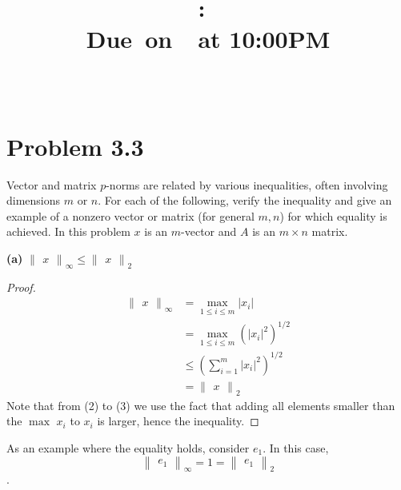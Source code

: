 \documentclass{article}
\title{
    \vspace{2in}
    \textmd{\textbf{\hmwkClass:\ \hmwkTitle}}\\
    \normalsize\vspace{0.1in}\small{Due\ on\ \hmwkDueDate\ at 10:00PM}\\
    \vspace{0.1in}\large{\textit{\hmwkClassInstructor\ \hmwkClassTime}}
    \vspace{3in}
}
\author{\hmwkAuthorName}
\date{}
\begin{document}
\maketitle

\pagebreak
\section*{Problem 3.3}
Vector and matrix $p$-norms are related by various inequalities, often involving dimensions $m$ or $n$. For each of the following, verify the inequality and give an example of a nonzero vector or matrix (for general $m, n$) for which equality is achieved. In this problem $x$ is an $m$-vector and $A$ is an $m\times n$ matrix.

\textbf{(a)}
$\begin{Vmatrix}
        x
    \end{Vmatrix}_\infty  \leq \begin{Vmatrix}
        x
    \end{Vmatrix}_2$
    \begin{proof}
        \begin{align}
            \begin{Vmatrix} x \end{Vmatrix}_\infty &= \max_{1 \leq i \leq m} \lvert x_i \rvert\\
            &= \max_{1 \leq i \leq m} \left( \lvert x_i \rvert^2 \right)^{1/2}\\
            &\leq \left( \sum_{i = 1}^m \lvert x_i \rvert^2 \right)^{1/2}\\
            &= \begin{Vmatrix}
                x
            \end{Vmatrix}_2
        \end{align}
        Note that from (2) to (3) we use the fact that adding all elements smaller than the $\max$ $x_i$ to $x_i$ is larger, hence the inequality.
    \end{proof}
    
    As an example where the equality holds, consider $e_1$. In this case, \[ \begin{Vmatrix} e_1 \end{Vmatrix}_\infty = 1 = \begin{Vmatrix} e_1 \end{Vmatrix}_2 \].
\end{document}
